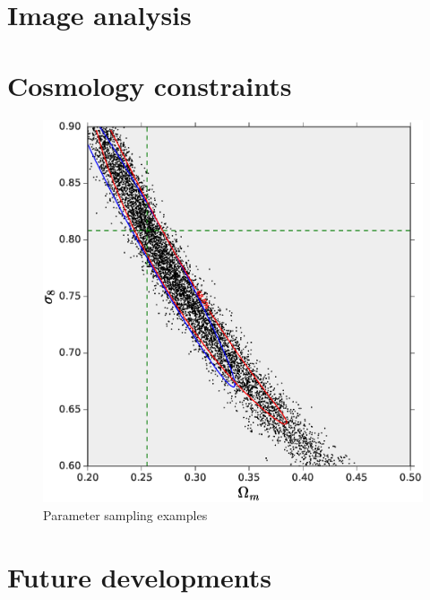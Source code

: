 \documentclass[reprint,aps,prd,superscriptaddress,showkeys,showpacs]{revtex4-1}
\begin{document}

\section{Image analysis}


\section{Cosmology constraints}

\begin{figure}
\includegraphics[scale=0.4]{Figures/parameter_sampling.eps}
\caption{Parameter sampling examples}
\label{samplingfig}
\end{figure}


\section{Future developments}
\end{document}
